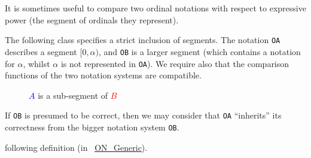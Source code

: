 It is sometimes useful to compare two ordinal notations with respect to expressive power
(the segment of ordinals  they represent). 

The following class specifies a strict inclusion of segments. The notation \texttt{OA} describes a segment $[0,\alpha)$, and \texttt{OB} is a larger segment (which contains a notation for $\alpha$, whilst $\alpha$ is not represented in \texttt{OA}). We require also  that the comparison functions of the two notation systems are compatible.

\begin{figure}[h]
   \centering
   \caption{\textcolor{blue}{$A$} is a sub-segment  of \textcolor{red}{$B$}}
   \label{fig:subsegment}
 \end{figure}

If \texttt{OB} is presumed to be correct, then we may consider that \texttt{OA} ``inherits'' its correctness from the bigger notation system \texttt{OB}.


\label{types:SubON}

following definition
(in ~\href{../theories/html/hydras.OrdinalNotations.ON_Generic.html}{ON\_Generic}).





